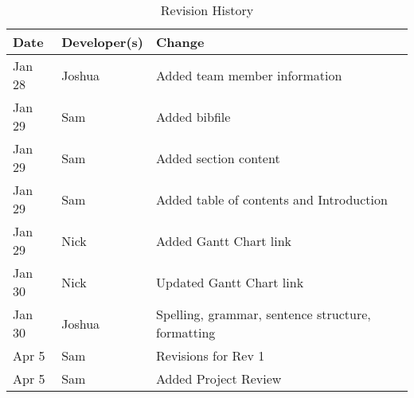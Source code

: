 \documentclass{article}
\begin{document}
\begin{table}[h]
\caption{Revision History} \label{TblRevisionHistory}
\begin{tabularx}{\textwidth}{lll}
\toprule
\textbf{Date} & \textbf{Developer(s)} & \textbf{Change}\\
\midrule
Jan 28 & Joshua & Added team member information\\
Jan 29 & Sam & Added bibfile\\
Jan 29 & Sam & Added section content\\
Jan 29 & Sam & Added table of contents and Introduction\\
Jan 29 & Nick & Added Gantt Chart link\\
Jan 30 & Nick & Updated Gantt Chart link\\
Jan 30 & Joshua & Spelling, grammar, sentence structure, formatting \\
\color{red}Apr 5&\color{red}Sam&\color{red}Revisions for Rev 1\\
\color{red}Apr 5&\color{red}Sam&\color{red}Added Project Review\\
\bottomrule
\end{tabularx}
\end{table}
\end{document}
